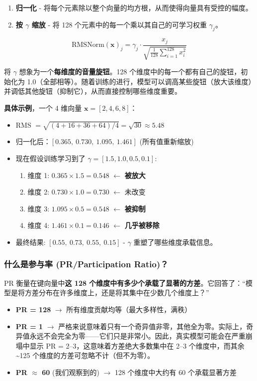\documentclass[11pt]{ctexart}
\begin{document}
\begin{enumerate}
\item \textbf{归一化} - 将每个元素除以整个向量的均方根，从而使得向量具有受控的幅度。
\item \textbf{按 $\gamma$ 缩放} - 将 128 个元素中的每一个乘以其自己的可学习权重 $\gamma_j$。
\end{enumerate}

$$\text{RMSNorm}(\mathbf{x})_j = \gamma_j \cdot \frac{x_j}{\sqrt{\frac{1}{128}\sum_{i=1}^{128} x_i^2}}$$

将 $\gamma$ 想象为一个\textbf{每维度的音量旋钮}。128 个维度中的每一个都有自己的旋钮，初始化为 1.0（全部相等）。随着训练的进行，模型可以调高某些旋钮（放大该维度）并调低其他旋钮（抑制它），从而直接控制哪些维度重要。

\textbf{具体示例}，一个 4 维向量 $\mathbf{x} = [2, 4, 6, 8]$：
\begin{itemize}
\item RMS $= \sqrt{(4 + 16 + 36 + 64)/4} = \sqrt{30} \approx 5.48$
\item 归一化后：$[0.365,\ 0.730,\ 1.095,\ 1.461]$ (所有值重新缩放)
\item 现在假设训练学习到了 $\gamma = [1.5, 1.0, 0.5, 0.1]$:
\begin{enumerate}
\item 维度 1: $0.365 \times 1.5 = 0.548$ $\leftarrow$ \textbf{被放大}
\item 维度 2: $0.730 \times 1.0 = 0.730$ $\leftarrow$ 未改变
\item 维度 3: $1.095 \times 0.5 = 0.548$ $\leftarrow$ \textbf{被抑制}
\item 维度 4: $1.461 \times 0.1 = 0.146$ $\leftarrow$ \textbf{几乎被移除}
\end{enumerate}
\item 最终结果: $[0.55,\ 0.73,\ 0.55,\ 0.15]$ - $\gamma$ 重塑了哪些维度承载信息。
\end{itemize}

\subsubsection{什么是参与率 (PR/Participation Ratio)？}

PR 衡量在键向量中\textbf{这 128 个维度中有多少个承载了显著的方差}。它回答了：“模型是将方差分布在许多维度上，还是将其集中在少数几个维度上？”

\begin{itemize}
\item \textbf{PR = 128} $\rightarrow$ 所有维度贡献均等（最大多样性，满秩）
\item \textbf{PR = 1} $\rightarrow$ 严格来说意味着只有一个奇异值非零，其他全为零。实际上，奇异值永远不会完全为零——它们只是非常小。因此，真实模型可能会在严重崩塌中显示 PR = 2--3，这意味着方差绝大多数集中在 2--3 个维度中，而其余 \textasciitilde125 个维度的方差可忽略不计（但不为零）。
\item \textbf{PR $\approx$ 60} (我们观察到的) $\rightarrow$ 128 个维度中大约有 60 个承载显著方差
\end{itemize}
\end{document}
